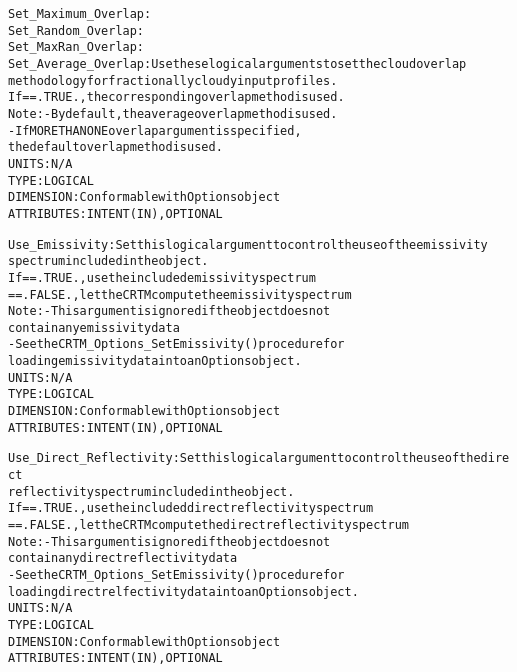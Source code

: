 \begin{alltt}
    Set_Maximum_Overlap:      
    Set_Random_Overlap:       
    Set_MaxRan_Overlap:       
    Set_Average_Overlap:      Use these logical arguments to set the cloud overlap 
                              methodology for fractionally cloudy input profiles.
                              If == .TRUE. , the corresponding overlap method is used.
                              Note: - By default, the average overlap method is used.
                                    - If MORE THAN ONE overlap argument is specified,
                                      the default overlap method is used.
                              UNITS:      N/A
                              TYPE:       LOGICAL
                              DIMENSION:  Conformable with Options object
                              ATTRIBUTES: INTENT(IN), OPTIONAL
 
    Use_Emissivity:           Set this logical argument to control the use of the emissivity
                              spectrum included in the object.
                              If == .TRUE. , use the included emissivity spectrum
                                 == .FALSE., let the CRTM compute the emissivity spectrum
                              Note: - This argument is ignored if the object does not
                                      contain any emissivity data
                                    - See the CRTM_Options_SetEmissivity() procedure for
                                      loading emissivity data into an Options object.
                              UNITS:      N/A
                              TYPE:       LOGICAL
                              DIMENSION:  Conformable with Options object
                              ATTRIBUTES: INTENT(IN), OPTIONAL
                           
    Use_Direct_Reflectivity:  Set this logical argument to control the use of the direct
                              reflectivity spectrum included in the object.
                              If == .TRUE. , use the included direct reflectivity spectrum
                                 == .FALSE., let the CRTM compute the direct reflectivity spectrum
                              Note: - This argument is ignored if the object does not
                                      contain any direct reflectivity data
                                    - See the CRTM_Options_SetEmissivity() procedure for
                                      loading direct relfectivity data into an Options object.
                              UNITS:      N/A
                              TYPE:       LOGICAL
                              DIMENSION:  Conformable with Options object
                              ATTRIBUTES: INTENT(IN), OPTIONAL
                           

\end{alltt}
